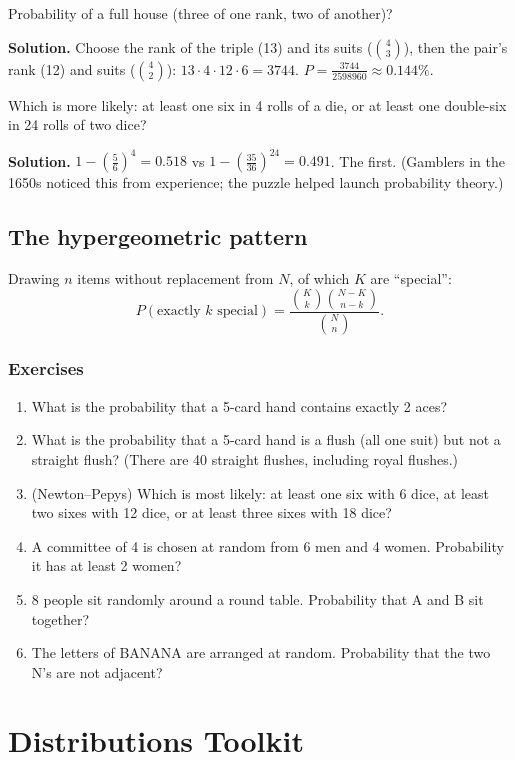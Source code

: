 \documentclass[11pt,a4paper,openany]{report}
\newenvironment{exercises}{\subsection*{Exercises \thechapter}\begin{enumerate}[label=\textbf{\thechapter.\arabic*},leftmargin=3.2em]}{\end{enumerate}}
\newcommand{\C}[2]{\binom{#1}{#2}}
\begin{document}
\begin{example}
Probability of a full house (three of one rank, two of another)?

\textbf{Solution.} Choose the rank of the triple (13) and its suits ($\C43$), then the pair's rank (12) and suits ($\C42$):
$13\cdot4\cdot12\cdot6=3744$. $P=\frac{3744}{2598960}\approx\mathbf{0.144\%}$.
\end{example}

\begin{example}[de M\'er\'e's paradox]
Which is more likely: at least one six in 4 rolls of a die, or at least one double-six in 24 rolls of two dice?

\textbf{Solution.} $1-\left(\frac56\right)^4=0.518$ vs $1-\left(\frac{35}{36}\right)^{24}=0.491$. The first. (Gamblers in the 1650s noticed this from experience; the puzzle helped launch probability theory.)
\end{example}

\section{The hypergeometric pattern}
Drawing $n$ items without replacement from $N$, of which $K$ are ``special'':
\[P(\text{exactly }k\text{ special})=\frac{\C Kk\C{N-K}{n-k}}{\C Nn}.\]

\begin{exercises}
\item What is the probability that a 5-card hand contains exactly 2 aces?
\item What is the probability that a 5-card hand is a flush (all one suit) but not a straight flush? (There are 40 straight flushes, including royal flushes.)
\item (Newton--Pepys) Which is most likely: at least one six with 6 dice, at least two sixes with 12 dice, or at least three sixes with 18 dice?
\item A committee of 4 is chosen at random from 6 men and 4 women. Probability it has at least 2 women?
\item 8 people sit randomly around a round table. Probability that A and B sit together?
\item The letters of BANANA are arranged at random. Probability that the two N's are not adjacent?
\end{exercises}

\chapter{Distributions Toolkit}\label{ch:distr}
\end{document}
